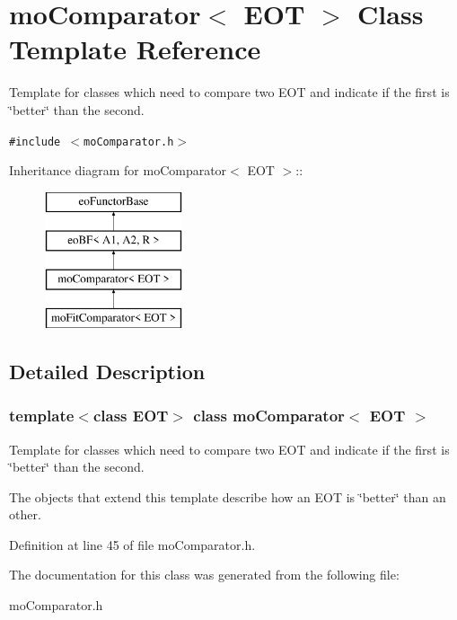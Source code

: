 \section{mo\-Comparator$<$ EOT $>$ Class Template Reference}
\label{classmo_comparator}
Template for classes which need to compare two EOT and indicate if the first is \char`\"{}better\char`\"{} than the second.  


{\tt \#include $<$mo\-Comparator.h$>$}

Inheritance diagram for mo\-Comparator$<$ EOT $>$::\begin{figure}[H]
\begin{center}
\leavevmode
\includegraphics[height=4cm]{classmo_comparator}
\end{center}
\end{figure}


\subsection{Detailed Description}
\subsubsection*{template$<$class EOT$>$ class mo\-Comparator$<$ EOT $>$}

Template for classes which need to compare two EOT and indicate if the first is \char`\"{}better\char`\"{} than the second. 

The objects that extend this template describe how an EOT is \char`\"{}better\char`\"{} than an other. 



Definition at line 45 of file mo\-Comparator.h.

The documentation for this class was generated from the following file:\begin{CompactItemize}
\item 
mo\-Comparator.h\end{CompactItemize}
